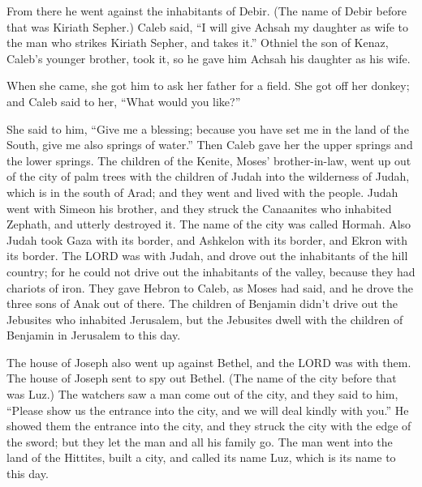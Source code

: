 \myverse{}From there he went against the inhabitants of Debir. (The name
of Debir before that was Kiriath Sepher.)
\myverse{}Caleb said, “I will give Achsah my daughter as wife to the man who strikes
Kiriath Sepher, and takes it.”
\myverse{}Othniel the son of Kenaz, Caleb’s younger brother, took it, so he gave him
Achsah his daughter as his wife.

\myverse{}When she came, she got him to ask her father for a field. She
got off her donkey; and Caleb said to her, “What would you like?”

\myverse{}She said to him, “Give me a blessing; because you have set me
in the land of the South, give me also springs of water.” Then Caleb gave her the upper springs and the
lower springs.
\myverse{}The children of the Kenite, Moses’ brother-in-law, went up out of the city
of palm trees with the children of Judah into the wilderness of Judah, which is in the south of Arad;
and they went and lived with the people.
\myverse{}Judah went with Simeon his brother, and they struck the Canaanites who inhabited
Zephath, and utterly destroyed it. The name of the city was called Hormah.
\myverse{}Also Judah took Gaza with its border, and Ashkelon with its border, and Ekron
with its border.
\myverse{}The LORD was with Judah, and drove out the inhabitants of the hill country;
for he could not drive out the inhabitants of the valley, because they had chariots of iron.
\myverse{}They gave Hebron to Caleb, as Moses had said, and he drove the three sons
of Anak out of there.
\myverse{}The children of Benjamin didn’t drive out the Jebusites who inhabited Jerusalem,
but the Jebusites dwell with the children of Benjamin in Jerusalem to this day.

\myverse{}The house of Joseph also went up against Bethel, and the LORD
was with them.
\myverse{}The house of Joseph sent to spy out Bethel. (The name of the city before that
was Luz.)
\myverse{}The watchers saw a man come out of the city, and they said to him, “Please
show us the entrance into the city, and we will deal kindly with you.”
\myverse{}He showed them the entrance into the city, and they struck the city with the
edge of the sword; but they let the man and all his family go.
\myverse{}The man went into the land of the Hittites, built a city, and called its name
Luz, which is its name to this day.

